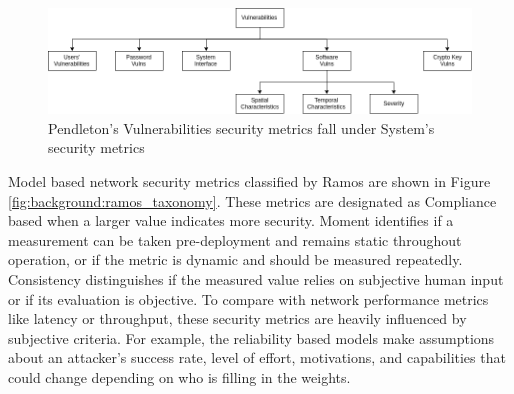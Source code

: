 \begin{figure}[ht]
\centering
\includegraphics[width=.95\linewidth]{resource/img/ch_background/cybok_metrics/pendleton_vulns.png}
\caption{Pendleton’s Vulnerabilities security metrics fall under System’s security metrics
\label{fig:background:pendleton_vuln_metrics}}
\end{figure} 

Model based network security metrics classified by Ramos\cite{Ramos_Lazar_Filho_Rodrigues_2017} are shown in Figure \ref{fig:background:ramos_taxonomy}. These metrics are designated as Compliance based when a larger value indicates more security. Moment identifies if a measurement can be taken pre-deployment and remains static throughout operation, or if the metric is dynamic and should be measured repeatedly. Consistency distinguishes if the measured value relies on subjective human input or if its evaluation is objective. To compare with network performance metrics like latency or throughput, these security metrics are heavily influenced by subjective criteria. For example, the reliability based models make assumptions about an attacker’s success rate, level of effort, motivations, and capabilities that could change depending on who is filling in the weights. 

